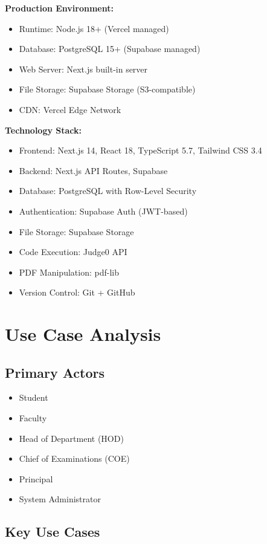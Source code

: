\textbf{Production Environment:}
\begin{itemize}
\item Runtime: Node.js 18+ (Vercel managed)
\item Database: PostgreSQL 15+ (Supabase managed)
\item Web Server: Next.js built-in server
\item File Storage: Supabase Storage (S3-compatible)
\item CDN: Vercel Edge Network
\end{itemize}

\textbf{Technology Stack:}
\begin{itemize}
\item Frontend: Next.js 14, React 18, TypeScript 5.7, Tailwind CSS 3.4
\item Backend: Next.js API Routes, Supabase
\item Database: PostgreSQL with Row-Level Security
\item Authentication: Supabase Auth (JWT-based)
\item File Storage: Supabase Storage
\item Code Execution: Judge0 API
\item PDF Manipulation: pdf-lib
\item Version Control: Git + GitHub
\end{itemize}

\section{Use Case Analysis}

\subsection{Primary Actors}
\begin{itemize}
\item Student
\item Faculty
\item Head of Department (HOD)
\item Chief of Examinations (COE)
\item Principal
\item System Administrator
\end{itemize}

\subsection{Key Use Cases}

